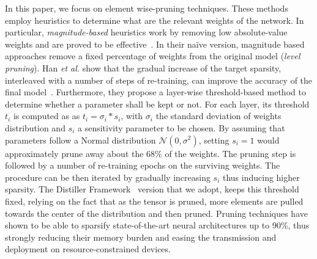 In this paper, we focus on element wise-pruning techniques. These methods employ heuristics to determine what are the relevant weights of the network. In particular, \textit{magnitude-based} heuristics work by removing low absolute-value weights and are proved to be effective~\cite{DBLP:journals/corr/HanPTD15,DBLP:journals/corr/GuoYC16}. In their na\"ive version, magnitude based approaches remove a fixed percentage of weights from the original model (\emph{level pruning}). Han \emph{et al.} show that the gradual increase of the target sparsity, interleaved with a number of steps of re-training, can improve the accuracy of the final model~\cite{DBLP:journals/corr/HanPTD15}. Furthermore, they propose a layer-wise threshold-based method to determine whether a parameter shall be kept or not. For each layer, its threshold $t_i$ is computed as as $t_i = \sigma_i * s_i$, with $\sigma_i$ the standard deviation of weights distribution and $s_i$ a sensitivity parameter to be chosen. By assuming that parameters follow a Normal distribution $ \mathcal{N}(0, \sigma^2) $, setting $s_i = 1$ would approximately prune away about the 68\% of the weights. The pruning step is followed by a number of re-training epochs on the surviving weights. The procedure can be then iterated by gradually increasing $s_i$ thus inducing higher sparsity. The Distiller Framework~\cite{nzmora2019distiller} version that we adopt, keeps this threshold fixed, relying on the fact that as the tensor is pruned, more elements are pulled towards the center of the distribution and then pruned. Pruning techniques have shown to be able to sparsify state-of-the-art neural architectures up to 90\%, thus strongly reducing their memory burden and easing the transmission and deployment on resource-constrained devices.



